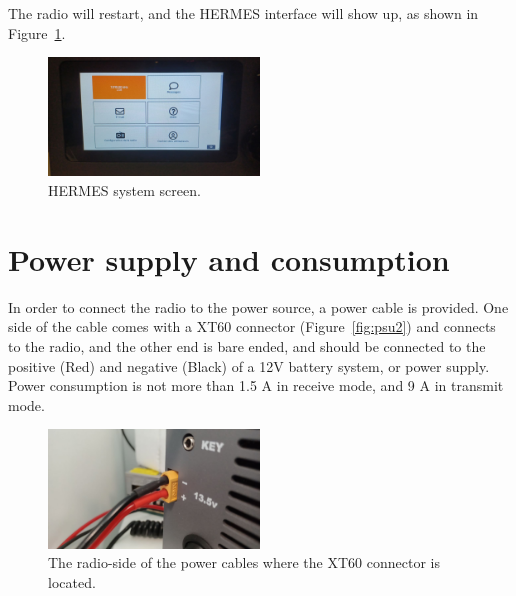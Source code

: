 \documentclass[11pt,a4paper]{article}
\begin{document}
The radio will restart, and the HERMES interface will show up, as shown in Figure~\ref{fig:inst8}.

\begin{figure}[H]
  \centering
  \includegraphics[width=0.5\textwidth]{pictures/inst-8.jpg}
  \caption{HERMES system screen.}
  \label{fig:inst8}
\end{figure}







\section{Power supply and consumption}

In order to connect the radio to the power source, a power cable is provided. One side of the
cable comes with a XT60 connector (Figure~\ref{fig:psu2}) and connects to the radio, and the other end is bare ended,
and should be connected to the positive (Red) and negative (Black) of a 12V battery system, or power
supply. Power consumption is not more than 1.5 A in receive mode, and 9 A in transmit mode.

\begin{figure}[!ht]
  \centering
  \includegraphics[width=0.5\textwidth]{pictures/psu1.jpeg}
  \caption{The radio-side of the power cables where the XT60 connector is located.}
  \label{fig:psu1}
\end{figure}
\end{document}
